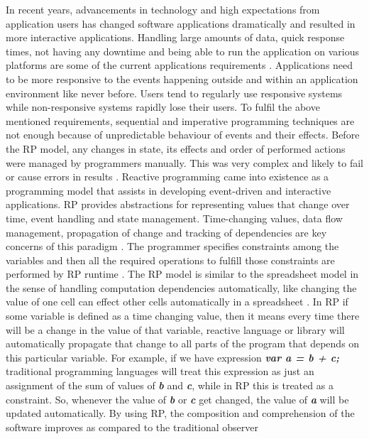 In recent years, advancements in technology and high expectations from application users has changed software applications dramatically and resulted in more interactive applications.
Handling large amounts of data, quick response times, not having any downtime and being able to run the application on various platforms are some of the current applications requirements \cite{reactiveManifesto}. Applications need to be more responsive to the events happening outside and within an application environment like never before. Users tend to regularly use responsive systems while non-responsive systems rapidly lose their users. To fulfil the above mentioned requirements, sequential and imperative programming techniques are not enough because of unpredictable behaviour of events and their effects. Before the RP model, any changes in state, its effects and order of performed actions were managed by programmers manually. This was very complex and likely to fail or cause errors in results \cite{Edwards:2009:CR:1639950.1640058}.
Reactive programming came into existence as a programming model that assists in developing event-driven and interactive applications. RP provides abstractions for representing values that change over time, event handling and state management. Time-changing values, data flow management, propagation of change and tracking of dependencies are key concerns of this paradigm \cite{Margara:2014:WDD:2611286.2611290}. The programmer specifies constraints among the variables and then all the required operations to fulfill those constraints are performed by RP runtime \cite{6840828}. The RP model is similar to the spreadsheet model in the sense of handling computation dependencies automatically, like changing the value of one cell can effect other cells automatically in a spreadsheet \cite{Bainomugisha:2013:SRP:2501654.2501666}. In RP if some variable is defined as a time changing value, then it means every time there will be a change in the value of that variable, reactive language or library will automatically propagate that change to all parts of the program that depends on this particular variable.
For example, if we have expression \textbf{\textit{var a = b + c;}} traditional programming languages will treat this expression as just an assignment of the sum of values of \textbf{\textit{b}} and \textbf{\textit{c}}, while in RP this is treated as a constraint. So, whenever the value of \textbf{\textit{b}} or \textbf{\textit{c}} get changed, the value of \textbf{\textit{a}} will be updated automatically.
By using RP, the composition and comprehension of the software improves as compared to the traditional observer
